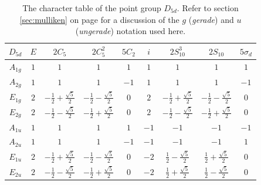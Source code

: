 \documentclass{article}
\begin{document}
    \begin{table}[htbp]
        \centering
        \renewcommand{\arraystretch}{1.5}
        \begin{tabular}{c|cccccccc}
            $D_{5d}$ & $E$ & $2C_5$ & $2C_5^2$ & $5C_2$ & $i$ & $2S_{10}^3$ & $2S_{10}$ & $5\sigma_d$\\
            \hline
            $A_{1g}$ & $1$ & $1$ & $1$ & $1$ & $1$ & $1$ & $1$ & $1$\\
            $A_{2g}$ & $1$ & $1$ & $1$ & $-1$ & $1$ & $1$ & $1$ & $-1$\\
            $E_{1g}$ & $2$ & $-\frac12+\frac{\sqrt{5}}{2}$ & $-\frac12-\frac{\sqrt{5}}{2}$ & $0$ & $2$ & $-\frac12+\frac{\sqrt{5}}{2}$ & $-\frac12-\frac{\sqrt{5}}{2}$ & $0$\\
            $E_{2g}$ & $2$ & $-\frac12-\frac{\sqrt{5}}{2}$ & $-\frac12+\frac{\sqrt{5}}{2}$ & $0$ & $2$ & $-\frac12-\frac{\sqrt{5}}{2}$ & $-\frac12+\frac{\sqrt{5}}{2}$ & $0$\\
            $A_{1u}$ & $1$ & $1$ & $1$ & $1$ & $-1$ & $-1$ & $-1$ & $-1$\\
            $A_{2u}$ & $1$ & $1$ & $1$ & $-1$ & $-1$ & $-1$ & $-1$ & $1$\\
            $E_{1u}$ & $2$ & $-\frac12+\frac{\sqrt{5}}{2}$ & $-\frac12-\frac{\sqrt{5}}{2}$ & $0$ & $-2$ & $\frac12-\frac{\sqrt{5}}{2}$ & $\frac12+\frac{\sqrt{5}}{2}$ & $0$\\
            $E_{2u}$ & $2$ & $-\frac12-\frac{\sqrt{5}}{2}$ & $-\frac12+\frac{\sqrt{5}}{2}$ & $0$ & $-2$ & $\frac12+\frac{\sqrt{5}}{2}$ & $\frac12-\frac{\sqrt{5}}{2}$ & $0$\\
        \end{tabular}
        \caption{The character table of the point group $D_{5d}$. \cite{miessler2014} Refer to section \ref{sec:mulliken} on page \pageref{sec:mulliken} for a discussion of the $g$ (\emph{gerade}) and $u$ (\emph{ungerade}) notation used here.}
        \label{tab:d5d}
    \end{table}
\end{document}
